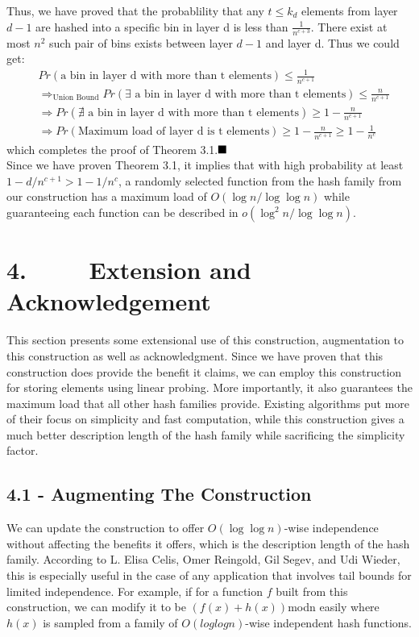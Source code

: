 \documentclass[a4paper, english]{paper}
\begin{document}
 Thus, we have proved that the probablility that any $t\le k_d$ elements from layer $d-1$ are hashed into a specific bin in layer d is less than $\frac{1}{n^{c+3}}$. There exist at most $n^2$ such pair of bins exists between layer $d-1$ and layer d. Thus we could get:
\begin{align*}
&Pr(\text{a bin in layer d with more than t elements})\le\frac1{n^{c+1}}\\
&\Rightarrow_{\text{Union Bound}} Pr(\exists\text{ a bin in layer d with more than t elements})\le\frac n{n^{c+1}}\\
&\Rightarrow Pr(\nexists\text{ a bin in layer d with more than t elements})\ge 1-\frac n{n^{c+1}}\\
&\Rightarrow Pr(\text{Maximum load of layer d is t elements})\ge 1-\frac n{n^{c+1}}\ge 1-\frac1{n^c}
\end{align*}
which completes the proof of Theorem 3.1.$\hfill\blacksquare$ \\

Since we have proven Theorem 3.1, it implies that with high probability at least $1-d/n^{c+1} > 1-1/n^c$, a randomly selected function from the hash family from our construction has a maximum load of $O(\log n/\log\log n)$ while guaranteeing each function can be described in $o(\log^2 n/\log\log n)$. 


	 \section{4. $\qquad$ Extension and Acknowledgement}
	\quad This section presents some extensional use of this construction, augmentation to this construction as well as acknowledgment. Since we have proven that this construction does provide the benefit it claims, we can employ this construction for storing elements using linear probing. More importantly, it also guarantees the maximum load that all other hash families provide. Existing algorithms put more of their focus on simplicity and fast computation, while this construction gives a much better description length of the hash family while sacrificing the simplicity factor.
	 
	 \subsection{4.1 - Augmenting The Construction} 
	\quad We can update the construction to offer $O(\log\log n)$-wise independence without affecting the benefits it offers, which is the description length of the hash family. According to L. Elisa Celis, Omer Reingold, Gil Segev, and Udi Wieder, this is especially useful in the case of any application that involves tail bounds for limited independence. For example, if for a function $f$ built from this construction, we can modify it to be $(f(x)+h(x))$modn easily where $h(x)$ is sampled from a family of $O(loglogn)$-wise independent hash functions. 
	 
\end{document}
